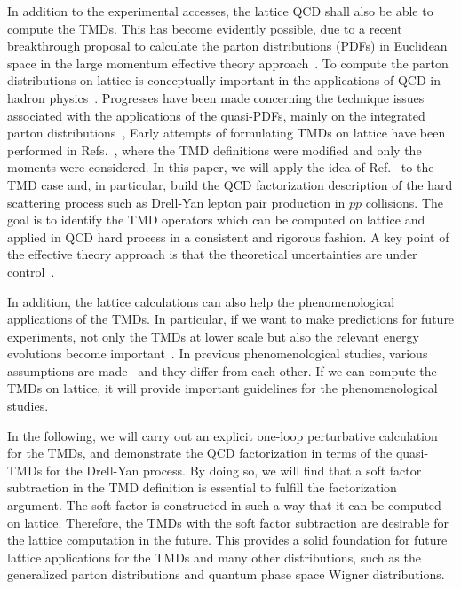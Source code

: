 \documentclass[aps,prd,preprint,tightenlines,superscriptaddress,nofootinbib]{revtex4}
\begin{document}
In addition to the experimental accesses, the lattice QCD shall also be able to compute the TMDs. 
This has become evidently possible, due to a recent breakthrough proposal
to calculate the parton distributions (PDFs) in Euclidean space in the large momentum
effective theory approach~\cite{Ji:2013dva}. 
To compute the parton distributions on lattice is conceptually 
important in the applications of QCD in hadron physics~\cite{Ma:2014jla,Xiong:2013bka,Lin:2014zya,Musch:2010ka}.
Progresses have been made concerning the technique issues associated with 
the applications of the quasi-PDFs, mainly on the integrated parton
distributions~\cite{Ma:2014jla,Xiong:2013bka,Lin:2014zya}, 
Early attempts of formulating TMDs on lattice
have been performed in Refs.~\cite{Musch:2010ka}, where the 
TMD definitions were modified and only the moments were considered. 
In this paper, we will apply the idea of Ref.~\cite{Ji:2013dva} to the TMD
case and, in particular, build the QCD factorization description of the hard
scattering process such as Drell-Yan lepton pair production in $pp$ collisions.
The goal is to identify the TMD operators which can be
computed on lattice and applied in QCD hard process 
in a consistent and rigorous fashion. 
A key point of the effective theory approach is that 
the theoretical uncertainties are under control~\cite{Ji:2013dva}.

In addition, the lattice calculations can also help the phenomenological applications of the TMDs.
In particular, if we want to make predictions for future experiments, not only the TMDs at lower scale
but also the relevant energy evolutions become important~\cite{Aybat:2011ta,Sun:2013dya}.
In previous phenomenological studies, various assumptions are 
made~\cite{Sun:2013dya,Aidala:2014hva,Aybat:2011zv,Landry:2002ix,Echevarria:2014xaa}
and they differ from each other. If we can compute the TMDs on lattice, it 
will provide important guidelines for the phenomenological studies.

In the following, we will carry out an explicit one-loop perturbative calculation for the TMDs, 
and demonstrate the QCD factorization in terms of the quasi-TMDs for the Drell-Yan process.
By doing so, we will find that a soft factor subtraction in the TMD definition is essential
to fulfill the factorization argument. The soft factor is constructed in such a way that it
can be computed on lattice. Therefore, the TMDs with the soft factor 
subtraction are desirable for the lattice computation in the future. 
This provides a solid foundation for future lattice applications for the
TMDs and many other distributions, such as the generalized parton distributions and 
quantum phase space Wigner distributions.
\end{document}
